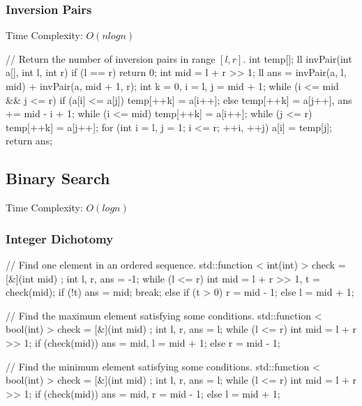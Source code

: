 \subsubsection{Inversion Pairs}
Time Complexity: $O(nlogn)$
\begin{cppcode}
// Return the number of inversion pairs in range $[l, r]$.
int temp[];
ll invPair(int a[], int l, int r)
{
    if (l == r) return 0;
    int mid = l + r >> 1;
    ll ans = invPair(a, l, mid) + invPair(a, mid + 1, r);
    int k = 0, i = l, j = mid + 1;
    while (i <= mid && j <= r)
    {
        if (a[i] <= a[j]) temp[++k] = a[i++];
        else temp[++k] = a[j++], ans += mid - i + 1;
    }
    while (i <= mid) temp[++k] = a[i++];
    while (j <= r) temp[++k] = a[j++];
    for (int i = l, j = 1; i <= r; ++i, ++j) a[i] = temp[j];
    return ans;
}
\end{cppcode}

\subsection{Binary Search}
Time Complexity: $O(logn)$
\subsubsection{Integer Dichotomy}
\begin{cppcode}
// Find one element in an ordered sequence.
std::function < int(int) > check = [&](int mid) {};
int l, r, ans = -1;
while (l <= r)
{
    int mid = l + r >> 1, t = check(mid);
    if (!t)
    {
        ans = mid; break;
    }
    else
    {
        if (t > 0) r = mid - 1;
        else l = mid + 1;
    }
}
\end{cppcode}
\begin{cppcode}
// Find the maximum element satisfying some conditions.
std::function < bool(int) > check = [&](int mid) {};
int l, r, ans = l;
while (l <= r)
{
    int mid = l + r >> 1;
    if (check(mid)) ans = mid, l = mid + 1;
    else r = mid - 1;
}
\end{cppcode}
\begin{cppcode}
// Find the minimum element satisfying some conditions.
std::function < bool(int) > check = [&](int mid) {};
int l, r, ans = l;
while (l <= r)
{
    int mid = l + r >> 1;
    if (check(mid)) ans = mid, r = mid - 1;
    else l = mid + 1;
}
\end{cppcode}
